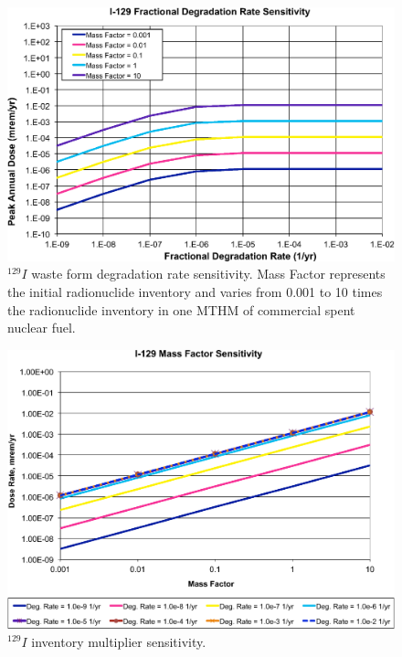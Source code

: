 \begin{figure}[H]
  \centering
  \includegraphics[width=\linewidth]{I129_deg_rate.eps}
  \caption{$^{129}I$ waste form degradation rate sensitivity. Mass Factor 
represents the initial radionuclide inventory and varies from 0.001 to 10 times 
the radionuclide inventory in one \gls{MTHM} of commercial spent nuclear fuel.}
  \label{fig:WFDegI129}
\end{figure}

\begin{figure}[H]
  \centering
  \includegraphics[width=\linewidth]{I129_mass_factor.eps}
  \caption{$^{129}I$ inventory multiplier sensitivity.}
  \label{fig:WFDegI129MF}
\end{figure}



